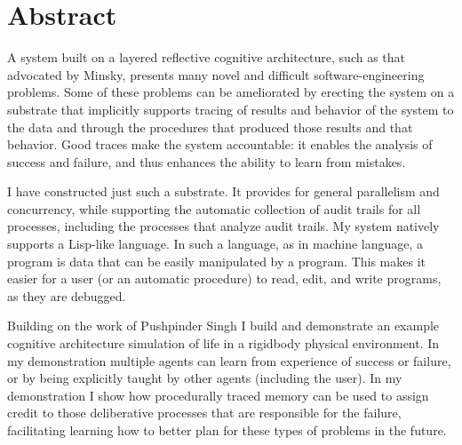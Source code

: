 \begingroup
\let\clearpage\relax
\let\cleardoublepage\relax
\let\cleardoublepage\relax

\chapter*{Abstract}

A system built on a layered reflective cognitive architecture, such as
that advocated by Minsky, presents many novel and difficult
software-engineering problems.  Some of these problems can be
ameliorated by erecting the system on a substrate that implicitly
supports tracing of results and behavior of the system to the data and
through the procedures that produced those results and that behavior.
Good traces make the system accountable: it enables the analysis of
success and failure, and thus enhances the ability to learn from
mistakes.

I have constructed just such a substrate.  It provides for general
parallelism and concurrency, while supporting the automatic collection
of audit trails for all processes, including the processes that
analyze audit trails.  My system natively supports a Lisp-like
language.  In such a language, as in machine language, a program is
data that can be easily manipulated by a program.  This makes it
easier for a user (or an automatic procedure) to read, edit, and write
programs, as they are debugged.

Building on the work of Pushpinder Singh I build and demonstrate an
example cognitive architecture simulation of life in a rigidbody
physical environment.  In my demonstration multiple agents can learn
from experience of success or failure, or by being explicitly taught
by other agents (including the user).  In my demonstration I show how
procedurally traced memory can be used to assign credit to those
deliberative processes that are responsible for the failure,
facilitating learning how to better plan for these types of problems
in the future.

\endgroup

\vfill



